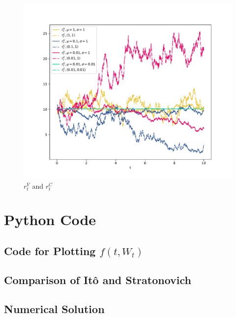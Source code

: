 
\begin{figure}[h]
    \centering
    \includegraphics[width=\textwidth]{num}
    \caption{$r_t^V$ and $r_t^C$}
    \label{fig:num}
\end{figure}

\appendix
\section{Python Code}
\subsection{Code for Plotting $f(t,W_t)$}

\subsection{Comparison of It\^o and Stratonovich}

\subsection{Numerical Solution}
